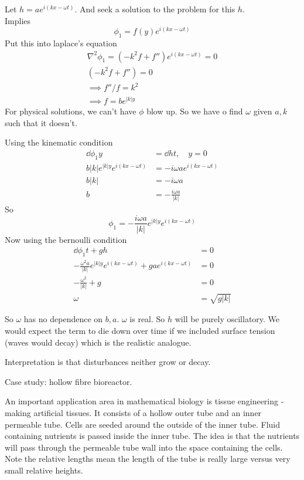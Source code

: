 \documentclass{X:/Documents/Coding/Latex/myassignment}
\begin{document}
Let $h = ae^{i(kx - \omega t)}$. And seek a solution to the problem for this $h$.\\
Implies
\[\phi_1 = f(y)e^{i(kx - \omega t)} \]
Put this into laplace's equation
\begin{align*}
    \nabla^2 \phi_1 = (-k^2f + f'')e^{i(kx - \omega t)} =0\\
    (-k^2f + f'') = 0\\
    \implies f''/f = k^2\\
    \implies f = be^{|k|y}
\end{align*}
For physical solutions, we can't have $\phi$ blow up.
So we have o find $\omega$ given $a,k$ such that it doesn't.

Using the kinematic condition
\begin{align*}
    \dd{\phi_1}y &= \dd ht, \quad y=0\\
    b |k| e^{|k|y} e^{i(kx-\omega t)} &= -i\omega a e^{i(kx - \omega t)}\\
    b|k| & = -i\omega a\\
    b &= -\frac{i\omega a}{|k|}
\end{align*}
So 
\[\phi_1 = -\frac{i\omega a}{|k|} e^{|k|y} e^{i(kx-\omega t)} \]
Now using the bernoulli condition
\begin{align*}
    \dd{\phi_1}{t} + gh &= 0\\
    -\frac{\omega^2 a}{|k|} e^{|k|y} e^{i(kx-\omega t)} + gae^{i(kx-\omega t)}&=0\\
    -\frac{\omega^2}{|k|} + g&=0\\
    \omega &= \sqrt{g|k|}
\end{align*}

So $\omega$ has no dependence on $b,a$. $\omega$ is real. So $h$ will be purely oscillatory.
We would expect the term to die down over time if we included surface tension (waves would decay) which is the realistic analogue.

Interpretation is that disturbances neither grow or decay.



Case study: hollow fibre bioreactor.

An important application area in mathematical biology is tissue engineering - making artificial tissues. It consists of a hollow outer tube and an inner permeable tube. Cells are seeded around the outside of the inner tube. Fluid containing nutrients is passed inside the inner tube. The idea is that the nutrients will pass through the permeable tube wall into the space containing the cells.
Note the relative lengths mean the length of the tube is really large versus very small relative heights. 
\end{document}
